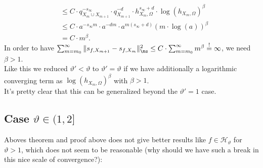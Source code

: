 \documentclass[a4paper, 10pt]{article}
\newcommand{\Ht}{\mathcal{H}_{\vartheta}}
\begin{document}
\begin{itemize}
\begin{align*}
&\leq C \cdot q_{X_m \cup X_{m+1}}^{-s_\infty} \cdot q_{X_{m+1}}^{-d} \cdot h_{X_m, \Omega}^{s_\infty + d} \cdot \log(h_{X_m, \Omega})^\beta \\
&\leq C \cdot a^{-s_\infty m} \cdot a^{-dm} \cdot a^{m (s_\infty + d)} (m \cdot \log(a))^\beta \\
&= C \cdot m^\beta.
\end{align*}
In order to have $\sum_{m=m_0}^\infty \Vert s_{f, X_{m+1}} - s_{f, X_m} \Vert_{\ns}^2 \leq C \cdot \sum_{m=m_0}^\infty m^\beta \stackrel{!}{=} \infty$, we need $\beta > 1$. \\
Like this we reduced $\vartheta' < \vartheta$ to $\vartheta' = \vartheta$ if we have additionally a logarithmic converging term as $\log(h_{X_m, \Omega})^\beta$ with $\beta > 1$. \\
It's pretty clear that this can be generalized beyond the $\vartheta' = 1$ case.
\end{itemize}


\subsection{Case $\vartheta \in (1, 2]$}

Aboves theorem and proof above does not give better results like $f \in \Ht$ for $\vartheta > 1$, 
which does not seem to be reasonable (why should we have such a break in this nice scale of convergence?):
\end{document}
